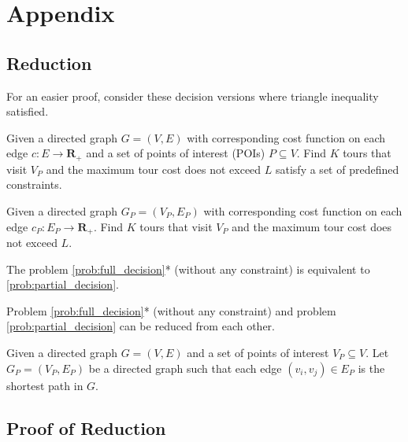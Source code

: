 \chapter{Appendix}

\section{Reduction}

For an easier proof, consider these decision versions where triangle inequality satisfied.

\begin{problem}
Given a directed graph $G = (V, E)$ with corresponding cost function on each edge $c: E \to \mathbf{R_+}$ and a set of points of interest (POIs) $P \subseteq V$. Find $K$ tours that visit $V_P$ and the maximum tour cost does not exceed $L$ satisfy a set of predefined constraints.
\label{prob:full_decision}
\end{problem}

\begin{problem}
Given a directed graph $G_P = (V_P, E_P)$ with corresponding cost function on each edge $c_P: E_P \to \mathbf{R_+}$. Find $K$ tours that visit $V_P$ and the maximum tour cost does not exceed $L$.
\label{prob:partial_decision}
\end{problem}

The problem \ref{prob:full_decision}* (without any constraint) is equivalent to \ref{prob:partial_decision}.

\begin{theorem}[Reduction] Problem \ref{prob:full_decision}* (without any constraint) and problem \ref{prob:partial_decision} can be reduced from each other.
\label{theo:reduction}
\end{theorem}

\begin{reduction} Given a directed graph $G = (V, E)$ and a set of points of interest $V_P \subseteq V$. Let $G_P = (V_P, E_P)$ be a directed graph such that each edge $(v_i, v_j) \in E_P$ is the shortest path in $G$.
\label{reduc:reduction}
\end{reduction}

\section{Proof of Reduction}

